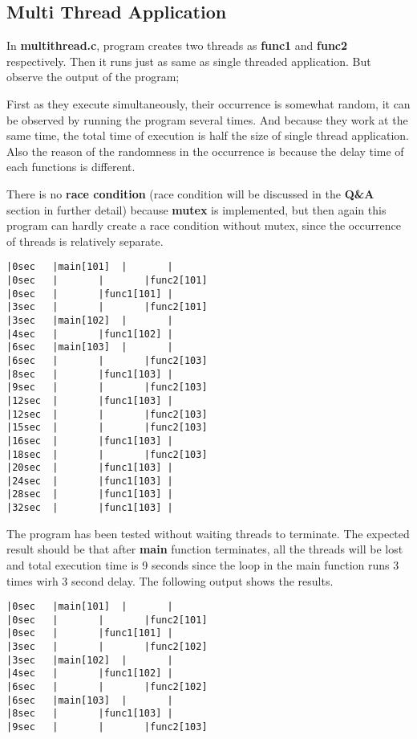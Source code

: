 \documentclass[11pt]{article}
\begin{document}
\subsection*{Multi Thread Application}
In \textbf{multithread.c}, program creates two threads as \textbf{func1} and \textbf{func2} respectively. Then it runs just as same as single threaded application. But observe the output of the program;

First as they execute simultaneously, their occurrence is somewhat random, it can be observed by running the program several times. And because they work at the same time, the total time of execution is half the size of single thread application. Also the reason of the randomness in the occurrence is because the delay time of each functions is different.

There is no \textbf{race condition} (race condition will be discussed in the \textbf{Q\&A} section in further detail) because \textbf{mutex} is implemented, but then again this program can hardly create a race condition without mutex, since the occurrence of threads is relatively separate.

\begin{minipage}{1\textwidth}
\begin{lstlisting}[title=Timeline (multithread.c), frame=tlrb]
|0sec	|main[101]	|		|
|0sec	|		|		|func2[101]
|0sec	|		|func1[101]	|
|3sec	|		|		|func2[101]
|3sec	|main[102]	|		|
|4sec	|		|func1[102]	|
|6sec	|main[103]	|		|
|6sec	|		|		|func2[103]
|8sec	|		|func1[103]	|
|9sec	|		|		|func2[103]
|12sec	|		|func1[103]	|
|12sec	|		|		|func2[103]
|15sec	|		|		|func2[103]
|16sec	|		|func1[103]	|
|18sec	|		|		|func2[103]
|20sec	|		|func1[103]	|
|24sec	|		|func1[103]	|
|28sec	|		|func1[103]	|
|32sec	|		|func1[103]	|
\end{lstlisting}
\end{minipage}

The program has been tested without waiting threads to terminate. The expected result should be that after \textbf{main} function terminates, all the threads will be lost and total execution time is 9 seconds since the loop in the main function runs 3 times wirh 3 second delay. The following output shows the results.

\begin{minipage}{1\textwidth}
\begin{lstlisting}[title=Timeline (multithread.c) without wait, frame=tlrb]
|0sec	|main[101]	|		|
|0sec	|		|		|func2[101]
|0sec	|		|func1[101]	|
|3sec	|		|		|func2[102]
|3sec	|main[102]	|		|
|4sec	|		|func1[102]	|
|6sec	|		|		|func2[102]
|6sec	|main[103]	|		|
|8sec	|		|func1[103]	|
|9sec	|		|		|func2[103]
\end{lstlisting}
\end{minipage}
\end{document}
